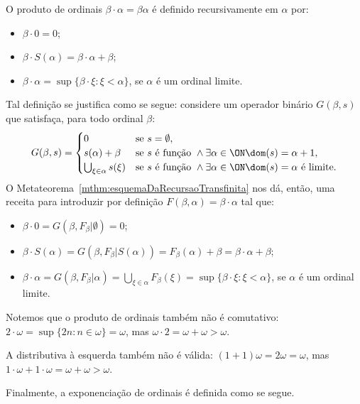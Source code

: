 \begin{definition}\label{def:produtoOrdinal}
    O produto de ordinais $\beta\cdot \alpha=\beta\alpha$ é definido recursivamente em $\alpha$ por:
    \begin{itemize}
        \item $\beta \cdot 0=0$;
        \item $\beta \cdot S(\alpha)=\beta\cdot \alpha+\beta$;
        \item $\beta\cdot \alpha=\sup\{\beta\cdot \xi : \xi <\alpha\}$, se $\alpha$ é um ordinal limite.
    \end{itemize}

    Tal definição se justifica como se segue:
    considere um operador binário $G(\beta, s)$ que satisfaça, para todo ordinal $\beta$:
    \[
        G(\beta, s)=
        \begin{cases}
            0 & \text{se } s=\emptyset,\\
            s(\alpha)+\beta & \text{se } s\text{ é função } \land  \exists \alpha \in \ON \dom(s)=\alpha+1,\\
            \bigcup_{\xi \in \alpha} s(\xi) & \text{se } s\text{ é função } \land \exists \alpha \in \ON \dom(s)=\alpha \text{ é limite}.
        \end{cases}
    \]
    O Metateorema~\ref{mthm:esquemaDaRecursaoTransfinita} nos dá, então, uma receita para introduzir por definição $F(\beta, \alpha)=\beta\cdot \alpha$ tal que:
    \begin{itemize}
        \item $\beta\cdot 0=G(\beta, F_\beta|\emptyset)=0$;
        \item $\beta\cdot S(\alpha)=G(\beta, F_\beta|S(\alpha))=F_\beta(\alpha)+\beta=\beta\cdot \alpha+\beta$;
        \item $\beta\cdot \alpha=G(\beta, F_\beta|\alpha)=\bigcup_{\xi \in \alpha} F_\beta(\xi)=\sup\{\beta\cdot \xi : \xi <\alpha\}$, se $\alpha$ é um ordinal limite.
    \end{itemize}
\end{definition}

Notemos que o produto de ordinais também não é comutativo: $2\cdot \omega=\sup\{2n: n\in \omega\}=\omega$, mas $\omega\cdot 2=\omega+\omega>\omega$.

A distributiva à esquerda também não é válida: $(1+1)\omega=2\omega=\omega$, mas $1\cdot \omega+1\cdot \omega=\omega+\omega>\omega$.

Finalmente, a exponenciação de ordinais é definida como se segue.

